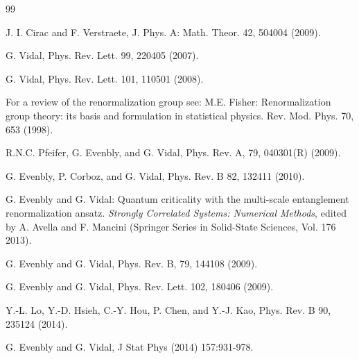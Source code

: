\documentclass[aps,prl,twocolumn,showpacs,superscriptaddress,floatfix,10pt]{revtex4-1}
\begin{document}
\begin{thebibliography}{99}

J. I. Cirac and F. Verstraete, 
J. Phys. A: Math. Theor. 42, 504004 (2009).

G. Vidal, 
Phys. Rev. Lett. 99, 220405 (2007). %

G. Vidal, 
Phys. Rev. Lett. 101, 110501 (2008). %

For a review of the renormalization group see: M.E. Fisher: Renormalization
group theory: its basis and formulation in statistical physics. Rev. Mod. Phys.
70, 653 (1998).

R.N.C. Pfeifer, G. Evenbly, and G. Vidal, 
Phys. Rev. A, 79, 040301(R) (2009).

G. Evenbly, P. Corboz, and G. Vidal, 
Phys. Rev. B 82, 132411 (2010). %

G. Evenbly and G. Vidal: Quantum criticality with the multi-scale entanglement
renormalization ansatz. \textit{Strongly Correlated Systems: Numerical
Methods}, edited by A. Avella and F. Mancini (Springer Series in Solid-State
Sciences, Vol. 176 2013).


G. Evenbly and G. Vidal, 
Phys. Rev. B, 79, 144108 (2009).

G. Evenbly and G. Vidal, 
Phys. Rev. Lett. 102, 180406 (2009).

Y.-L. Lo, Y.-D. Hsieh, C.-Y. Hou, P. Chen, and Y.-J. Kao, 
Phys. Rev. B 90, 235124 (2014). %

G. Evenbly and G. Vidal, 
J Stat Phys (2014) 157:931-978.


\end{thebibliography}
\end{document}
